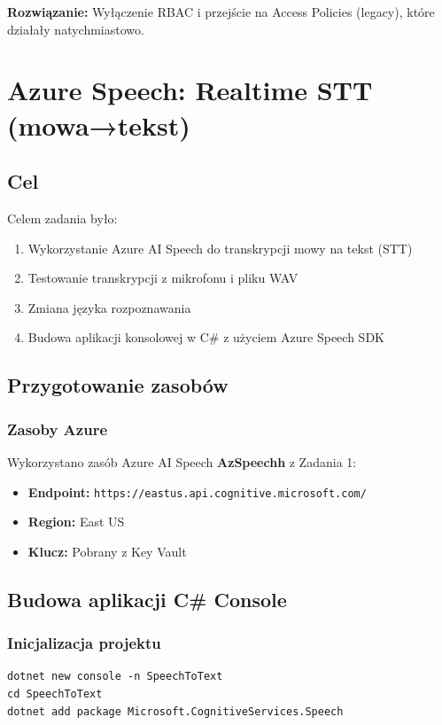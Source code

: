 \documentclass[twoside]{article}
\begin{document}
\textbf{Rozwiązanie:} Wyłączenie RBAC i przejście na Access Policies (legacy), które działały natychmiastowo.


\section{ Azure Speech: Realtime STT (mowa→tekst)}

\subsection{Cel}
Celem zadania było:
\begin{enumerate}
	\item Wykorzystanie Azure AI Speech do transkrypcji mowy na tekst (STT)
	\item Testowanie transkrypcji z mikrofonu i pliku WAV
	\item Zmiana języka rozpoznawania
	\item Budowa aplikacji konsolowej w C\# z użyciem Azure Speech SDK
\end{enumerate}

\subsection{Przygotowanie zasobów}

\subsubsection{Zasoby Azure}
Wykorzystano zasób Azure AI Speech \textbf{AzSpeechh} z Zadania 1:
\begin{itemize}
	\item \textbf{Endpoint:} \texttt{https://eastus.api.cognitive.microsoft.com/}
	\item \textbf{Region:} East US
	\item \textbf{Klucz:} Pobrany z Key Vault
\end{itemize}

\subsection{Budowa aplikacji C\# Console}

\subsubsection{Inicjalizacja projektu}

\begin{verbatim}
dotnet new console -n SpeechToText
cd SpeechToText
dotnet add package Microsoft.CognitiveServices.Speech
\end{verbatim}
\end{document}
